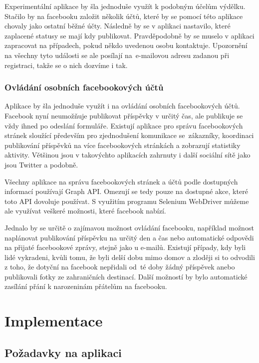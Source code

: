 \documentclass[thesis=M,czech]{FITthesis}[2013/05/10]
\begin{document}
Experimentální aplikace by šla jednoduše využít k podobným účelům výdělku. Stačilo by na facebooku založit několik účtů, které by se pomocí této aplikace chovaly jako ostatní běžné účty. Následně by se v aplikaci nastavilo, které zaplacené statusy se mají kdy publikovat. Pravděpodobně by se muselo v aplikaci zapracovat na případech, pokud někdo uvedenou osobu kontaktuje. Upozornění na všechny tyto události se ale posílají na~e-mailovou adresu zadanou při registraci, takže se o nich dozvíme i tak.

\subsection{Ovládání osobních facebookových účtů}

Aplikace by šla jednoduše využít i na ovládání osobních facebookových účtů. Facebook nyní neumožňuje publikovat příspěvky v určitý čas, ale publikuje se vždy ihned po odeslání formuláře. Existují aplikace pro správu facebookových stránek sloužící především pro zjednodušení komunikace se~zákazníky, koordinaci publikování příspěvků na více facebookových stránkách a zobrazují statistiky aktivity. Většinou jsou v takovýchto aplikacích zahrnuty i další sociální sítě jako jsou Twitter a podobně.

Všechny aplikace na správu facebookových stránek a účtů podle dostupných informací používají Graph API. Omezují se tedy pouze na dostupné akce, které toto API dovoluje používat. S využitím programu Selenium WebDriver můžeme ale využívat veškeré možnosti, které facebook nabízí.

Jednalo by se určitě o zajímavou možnost ovládání facebooku, například možnost naplánovat publikování příspěvku na určitý den a čas nebo automatické odpovědi na přijaté facebookové zprávy, stejně jako u e-mailů. Existují případy, kdy byli lidé vykradeni, kvůli tomu, že byli delší dobu mimo domov a zloději si to odvodili z toho, že dotyční na facebook nepřidali od~té doby žádný příspěvek anebo publikovali fotky ze zahraničních destinací. Další možností by bylo automatické zasílání přání k narozeninám přátelům na facebooku.



\chapter{Implementace}

\section{Požadavky na aplikaci}
\end{document}

